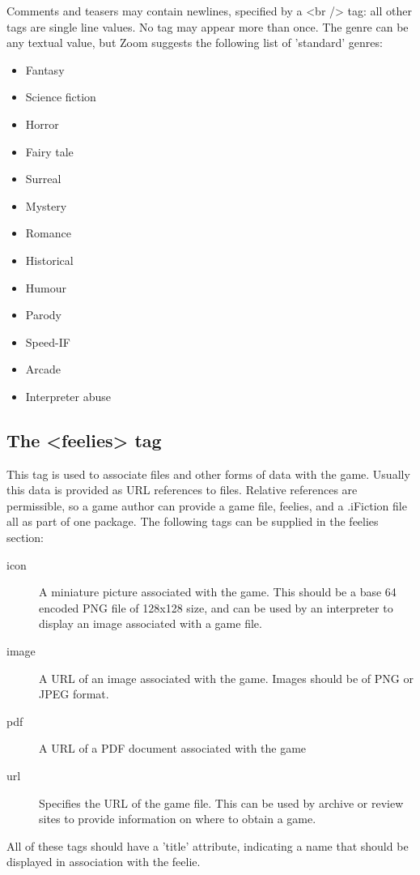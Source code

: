 \documentclass[a4paper,11pt]{article}
\begin{document}
Comments and teasers may contain newlines, specified by a <br /> tag: all other tags are
single line values. No tag may appear more than once. The genre can be any textual value,
but Zoom suggests the following list of 'standard' genres:

\begin{itemize}
\item Fantasy
\item Science fiction
\item Horror
\item Fairy tale
\item Surreal
\item Mystery
\item Romance
\item Historical
\item Humour
\item Parody
\item Speed-IF
\item Arcade
\item Interpreter abuse
\end{itemize}

\subsection{The <feelies> tag}

This tag is used to associate files and other forms of data with the game. Usually this data is
provided as URL references to files. Relative references are permissible, so a game author
can provide a game file, feelies, and a .iFiction file all as part of one package. The following
tags can be supplied in the feelies section:

\begin{description}
\item[icon] A miniature picture associated with the game. This should be a base 64 encoded 
PNG file of 128x128 size, and can be used by an interpreter to display an image associated with
a game file.
\item[image] A URL of an image associated with the game. Images should be of PNG or
JPEG format.
\item[pdf] A URL of a PDF document associated with the game
\item[url] Specifies the URL of the game file. This can be used by archive or review sites to
provide information on where to obtain a game.
\end{description}

All of these tags should have a 'title' attribute, indicating a name that should be displayed
in association with the feelie.
\end{document}
